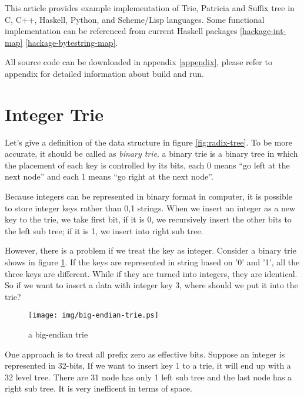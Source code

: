 \documentclass{article}
\begin{document}
This article provides example implementation of Trie, Patricia and Suffix tree
in C, C++, Haskell, Python, and Scheme/Lisp languages. Some functional
implementation can be referenced from current Haskell packages \ref{hackage-int-map} 
\ref{hackage-bytestring-map}.

All source code can be downloaded in appendix \ref{appendix}, please 
refer to appendix for detailed information about build and run.

\section{Integer Trie}
\label{int-trie}

Let's give a definition of the data structure in figure \ref{fig:radix-tree}.
To be more accurate, it should be called as \emph{binary trie}. a binary
trie is a binary tree in which the placement of each key is controlled by
its bits, each 0 means ``go left at the next node'' and each 1 means ``go
right at the next node''\cite{okasaki-int-map}.

Because integers can be represented in binary format in computer, it is 
possible to store integer keys rather than 0,1 strings. When we insert an
integer as a new key to the trie, we take first bit, if it is 0, we recursively
insert the other bits to the left sub tree; if it is 1, we insert into right
sub tree.

However, there is a problem if we treat the key as integer. Consider a binary
trie shows in figure \ref{fig:big-endian-trie}. If the keys are represented in 
string based on '0' and '1', all the three keys are different. While if they are
turned into integers, they are identical. So if we want to insert a data with integer
key 3, where should we put it into the trie?

\begin{figure}[htbp]
       \begin{center}
	\texttt{[image: img/big-endian-trie.ps]}
        \caption{a big-endian trie} \label{fig:big-endian-trie}
       \end{center}
\end{figure}

One approach is to treat all prefix zero as effective bits.
Suppose an integer is represented in 32-bits, If we want to insert key 1 to a trie, 
it will end up with a 32 level tree. 
There are 31 node has only 1 left sub tree and the last node has
a right sub tree. It is very inefficent in terms of space.
\end{document}
